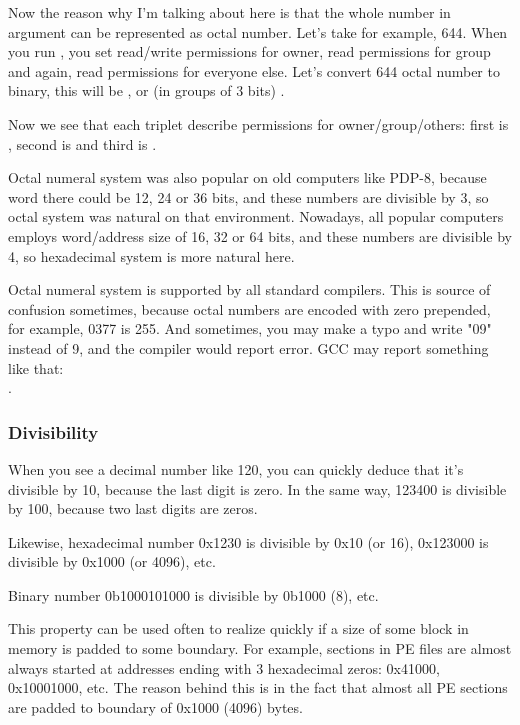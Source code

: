 Now the reason why I'm talking about  here is that the whole number in argument can be represented as octal number.
Let's take for example, 644.
When you run , you set read/write permissions for owner, read permissions for group and again, read permissions for everyone else.
Let's convert 644 octal number to binary, this will be , or (in groups of 3 bits) .

Now we see that each triplet describe permissions for owner/group/others: first is , second is  and third is .

Octal numeral system was also popular on old computers like PDP-8, because word there could be 12, 24 or 36 bits, and these numbers are divisible by 3, so octal system was natural on that environment.
Nowadays, all popular computers employs word/address size of 16, 32 or 64 bits, and these numbers are divisible by 4, so hexadecimal system is more natural here.

Octal numeral system is supported by all standard \CCpp compilers.
This is source of confusion sometimes, because octal numbers are encoded with zero prepended, for example, 0377 is 255.
And sometimes, you may make a typo and write "09" instead of 9, and the compiler would report error.
GCC may report something like that:\\
.

\subsubsection{Divisibility}

When you see a decimal number like 120, you can quickly deduce that it's divisible by 10, because the last digit is zero.
In the same way, 123400 is divisible by 100, because two last digits are zeros.

Likewise, hexadecimal number 0x1230 is divisible by 0x10 (or 16), 0x123000 is divisible by 0x1000 (or 4096), etc.

Binary number 0b1000101000 is divisible by 0b1000 (8), etc.

This property can be used often to realize quickly if a size of some block in memory is padded to some boundary.
For example, sections in \ac{PE} files are almost always started at addresses ending with 3 hexadecimal zeros: 0x41000, 0x10001000, etc.
The reason behind this is in the fact that almost all \ac{PE} sections are padded to boundary of 0x1000 (4096) bytes.

